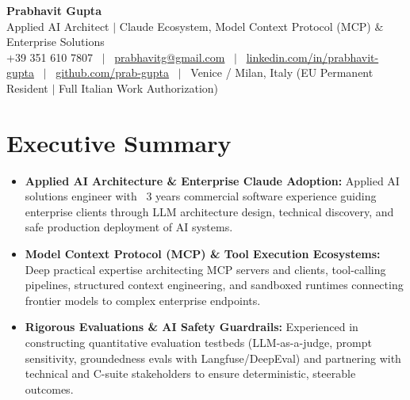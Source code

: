 \documentclass[a4paper,10pt]{article}
\begin{document}
\begin{minipage}[c]{0.80\textwidth}
  {\Huge\bfseries Prabhavit Gupta}\\[3pt]
  {\color{accent}\large Applied AI Architect $\vert$ Claude Ecosystem, Model Context Protocol (MCP) $\&$ Enterprise Solutions}\\[6pt]
  {\footnotesize +39 351 610 7807 ~$\vert$~
  \href{mailto:prabhavitg@gmail.com}{prabhavitg@gmail.com} ~$\vert$~
  \href{https://www.linkedin.com/in/prabhavit-gupta}{linkedin.com/in/prabhavit-gupta} ~$\vert$~
  \href{https://github.com/prab-gupta}{github.com/prab-gupta} ~$\vert$~
  Venice / Milan, Italy (EU Permanent Resident $\vert$ Full Italian Work Authorization)}
\end{minipage}\hfill

\vspace{6pt}

\section{Executive Summary}
\begin{itemize}
  \item \textbf{Applied AI Architecture \& Enterprise Claude Adoption:} Applied AI solutions engineer with ~3 years commercial software experience guiding enterprise clients through LLM architecture design, technical discovery, and safe production deployment of AI systems.
  \item \textbf{Model Context Protocol (MCP) \& Tool Execution Ecosystems:} Deep practical expertise architecting MCP servers and clients, tool-calling pipelines, structured context engineering, and sandboxed runtimes connecting frontier models to complex enterprise endpoints.
  \item \textbf{Rigorous Evaluations \& AI Safety Guardrails:} Experienced in constructing quantitative evaluation testbeds (LLM-as-a-judge, prompt sensitivity, groundedness evals with Langfuse/DeepEval) and partnering with technical and C-suite stakeholders to ensure deterministic, steerable outcomes.
\end{itemize}

\end{document}
